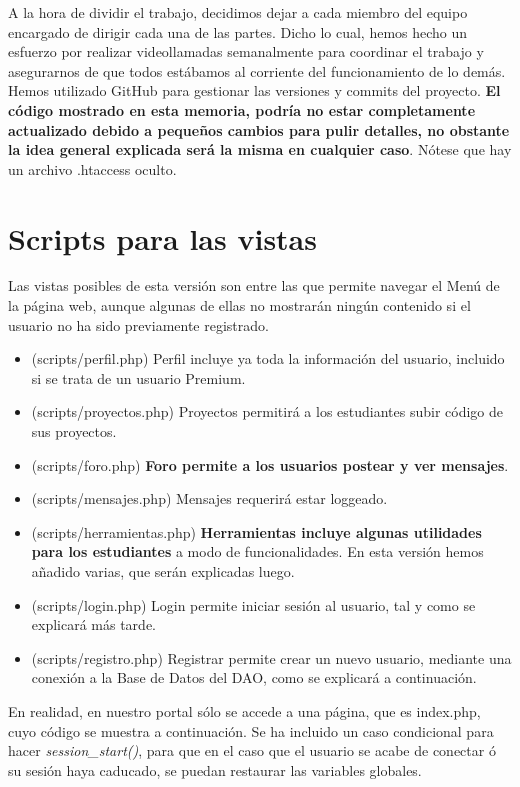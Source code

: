 \documentclass[12pt]{report}
\begin{document}
A la hora de dividir el trabajo, decidimos dejar a cada miembro del equipo encargado de dirigir cada una de las partes. Dicho lo cual, hemos hecho un esfuerzo por realizar videollamadas semanalmente para coordinar el trabajo y asegurarnos de que todos estábamos al corriente del funcionamiento de lo demás. Hemos utilizado GitHub para gestionar las versiones y commits del proyecto. \textbf{El código mostrado en esta memoria, podría no estar completamente actualizado debido a pequeños cambios para pulir detalles, no obstante la idea general explicada será la misma en cualquier caso}. Nótese que hay un archivo .htaccess oculto.
\newpage
\section{Scripts para las vistas}
Las vistas posibles de esta versión son entre las que permite navegar el Menú de la página web, aunque algunas de ellas no mostrarán ningún contenido si el usuario no ha sido previamente registrado.
\begin{itemize}
    \item (scripts/perfil.php) Perfil incluye ya toda la información del usuario, incluido si se trata de un usuario Premium.
    \item (scripts/proyectos.php) Proyectos permitirá a los estudiantes subir código de sus proyectos.
    \item (scripts/foro.php) \textbf{Foro permite a los usuarios postear y ver mensajes}.
    \item (scripts/mensajes.php) Mensajes requerirá estar loggeado.
    \item (scripts/herramientas.php) \textbf{Herramientas incluye algunas utilidades para los estudiantes} a modo de funcionalidades. En esta versión hemos añadido varias, que serán explicadas luego.
    \item (scripts/login.php) Login permite iniciar sesión al usuario, tal y como se explicará más tarde. 
    \item (scripts/registro.php) Registrar permite crear un nuevo usuario, mediante una conexión a la Base de Datos del DAO, como se explicará a continuación.
\end{itemize}

En realidad, en nuestro portal sólo se accede a una página, que es index.php, cuyo código se muestra a continuación. Se ha incluido un caso condicional para hacer \textit{session\_start()}, para que en el caso que el usuario se acabe de conectar ó su sesión haya caducado, se puedan restaurar las variables globales.
\end{document}
